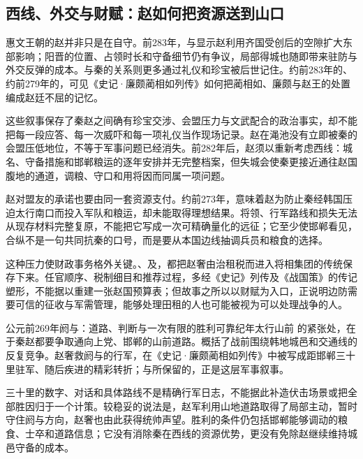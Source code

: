 \subsection{西线、外交与财赋：赵如何把资源送到山口}

惠文王朝的赵并非只是在自守。前283年，与显示赵利用齐国受创后的空隙扩大东部影响；阳晋的位置、占领时长和守备细节仍有争议，局部得城也随即带来驻防与外交反弹的成本。与秦的关系则更多通过礼仪和珍宝被后世记住。约前283年的、约前279年的，可见《史记·廉颇蔺相如列传》如何把蔺相如、廉颇与赵王的处置编成赵廷不屈的记忆。

这些叙事保存了秦赵之间确有珍宝交涉、会盟压力与文武配合的政治事实，却不能把每一段应答、每一次威吓和每一项礼仪当作现场记录。赵在渑池没有立即被秦的会盟压低地位，不等于军事问题已经消失。前282年后，赵须以重新考虑西线：城名、守备措施和邯郸粮运的逐年安排并无完整档案，但失城会使秦更接近通往赵国腹地的通道，调粮、守口和用将因而同属一项问题。

赵对盟友的承诺也要由同一套资源支付。约前273年，意味着赵为防止秦经韩国压迫太行南口而投入军队和粮运，却未能取得理想结果。将领、行军路线和损失无法从现存材料完整复原，不能把它写成一次可精确量化的远征；它至少使邯郸看见，合纵不是一句共同抗秦的口号，而是要从本国边线抽调兵员和粮食的选择。

这种压力使财政事务格外关键。、及，都把赵奢由治租税而进入将相集团的传统保存下来。任官顺序、税制细目和推荐过程，多经《史记》列传及《战国策》的传记塑形，不能据以重建一张赵国预算表；但故事之所以以财赋为入口，正说明边防需要可信的征收与军需管理，能够处理田租的人也可能被视为可以处理战争的人。

\begin{event}{公元前269年}{阏与：道路、判断与一次有限的胜利}{可靠纪年}{太行山前}
的紧张处，在于秦赵都要争取通向上党、邯郸的山前道路。概括了战前围绕韩地城邑和交通线的反复竞争。赵奢救阏与的行军，在《史记·廉颇蔺相如列传》中被写成距邯郸三十里驻军、随后疾进的精彩转折；与所保留的，正是这层军事叙事。

三十里的数字、对话和具体路线不是精确行军日志，不能据此补造伏击场景或把全部胜因归于一个计策。较稳妥的说法是，赵军利用山地道路取得了局部主动，暂时守住阏与方向，赵奢也由此获得统帅声望。胜利的条件仍包括邯郸能够调动的粮食、士卒和道路信息；它没有消除秦在西线的资源优势，更没有免除赵继续维持城邑守备的成本。
\end{event}

